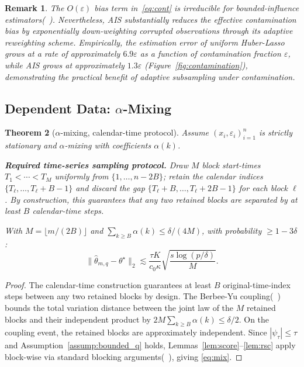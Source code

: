 \documentclass[10pt]{article}
\newtheorem{theorem}{Theorem}[section]
\newtheorem{remark}[theorem]{Remark}
\newcommand{\hth}{\hat{\theta}}
\newcommand{\ts}{\theta^{\star}}
\begin{document}
\begin{remark}
The $O(\varepsilon)$ bias term in~\eqref{eq:cont} is irreducible for bounded-influence
estimators(~\cite{huber1981robust}). Nevertheless, AIS substantially reduces the
effective contamination bias by exponentially down-weighting corrupted
observations through its adaptive reweighting scheme. Empirically,
the estimation error of uniform Huber-Lasso grows at a rate of approximately
$6.9\varepsilon$ as a function of contamination fraction $\varepsilon$, while
AIS grows at approximately $1.3\varepsilon$ (Figure~\ref{fig:contamination}),
demonstrating the practical benefit of adaptive subsampling under contamination.
\end{remark}

\subsection{Dependent Data: $\alpha$-Mixing}
\label{subsec:mix}

\begin{theorem}[$\alpha$-mixing, calendar-time protocol]\label{thm:mixing}
Assume $(x_i,\varepsilon_i)_{i=1}^n$ is strictly stationary and
$\alpha$-mixing with coefficients $\alpha(k)$.

\noindent\textbf{Required time-series sampling protocol.}
Draw $M$ block start-times $T_1<\cdots<T_M$ uniformly from
$\{1,\ldots,n-2B\}$; retain the calendar indices
$\{T_\ell,\ldots,T_\ell+B-1\}$ and discard the gap
$\{T_\ell+B,\ldots,T_\ell+2B-1\}$ for each block $\ell$.
By construction, this guarantees that any two retained blocks are separated
by at least $B$ calendar-time steps.

With $M=\lfloor m/(2B)\rfloor$ and
$\sum_{k\ge B}\alpha(k)\le\delta/(4M)$,
with probability $\ge1-3\delta$:
\begin{equation}\label{eq:mix}
  \|\hth_{m,q}-\ts\|_2
  \lesssim\frac{\tau K}{c_0\kappa}\sqrt{\frac{s\log(p/\delta)}{M}}.
\end{equation}
\end{theorem}
\begin{proof}
The calendar-time construction guarantees at least $B$ original-time-index steps
between any two retained blocks by design. The Berbee-Yu
coupling(~\cite{yu1994rates}) bounds the total variation distance between the
joint law of the $M$ retained blocks and their independent product by
$2M\sum_{k\ge B}\alpha(k)\le\delta/2$.
On the coupling event, the retained blocks are approximately independent.
Since $|\psi_\tau|\le\tau$ and Assumption~\ref{assump:bounded_q} holds,
Lemmas~\ref{lem:score}--\ref{lem:rsc} apply block-wise via standard blocking
arguments(~\cite{bradley2005basic}), giving \eqref{eq:mix}.
\end{proof}
\end{document}
